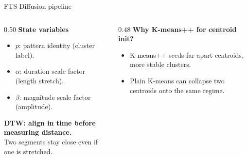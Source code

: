 \begin{frame}{FTS-Diffusion pipeline}
\vspace{2mm}
\begin{columns}[T,onlytextwidth]
\begin{column}{0.50\textwidth}\scriptsize
\textbf{State variables}
\begin{itemize}\setlength\itemsep{0pt}\setlength\topsep{0pt}
  \item $p$: pattern identity (cluster label).
  \item $\alpha$: duration scale factor (length stretch).
  \item $\beta$: magnitude scale factor (amplitude).
\end{itemize}
\vspace{1mm}
\textbf{DTW: align in time before measuring distance.}\\
Two segments stay close even if one is stretched.

\vspace{3mm}

\end{column}

\begin{column}{0.48\textwidth}\scriptsize
\textbf{Why K-means++ for centroid init?}
\begin{itemize}\setlength\itemsep{0pt}\setlength\topsep{0pt}
  \item K-means++ seeds far-apart centroids, more stable clusters.
  \item Plain K-means can collapse two centroids onto the same regime.
\end{itemize}
\end{column}
\end{columns}
\end{frame}